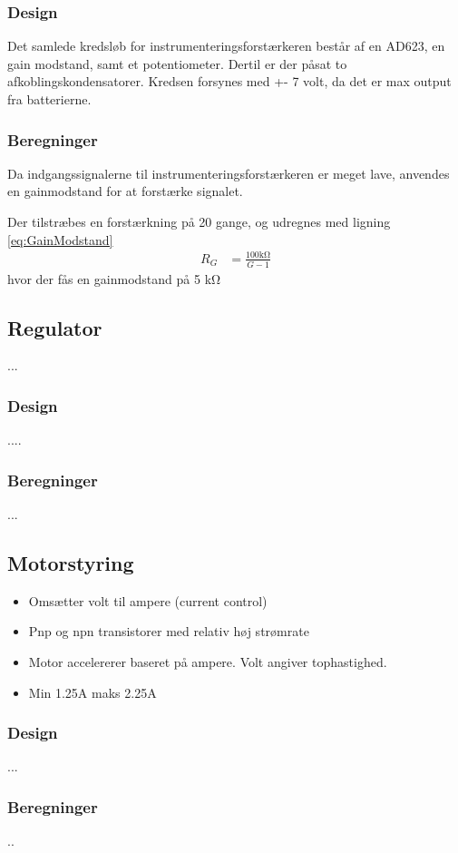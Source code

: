 \subsubsection{Design}
Det samlede kredsløb for instrumenteringsforstærkeren består af en AD623, en gain modstand, samt et potentiometer. Dertil er der påsat to afkoblingskondensatorer. Kredsen forsynes med +- 7 volt, da det er max output fra batterierne. 


\subsubsection{Beregninger}
Da indgangssignalerne til instrumenteringsforstærkeren er meget lave, anvendes en gainmodstand for at forstærke signalet.

Der tilstræbes en forstærkning på 20 gange, og udregnes med ligning \ref{eq:GainModstand}
\begin{align}
	R_G & = \frac{100 \si{\kilo\ohm}}{G-1} \label{eq:GainModstand}
\end{align}
hvor der fås en gainmodstand på 5 \si{\kilo\ohm}

\subsection{Regulator}
...

\subsubsection{Design}
....
\subsubsection{Beregninger}
...

\subsection{Motorstyring}\label{sec:sec_motorstyring}

\begin{itemize}
	\item Omsætter volt til ampere (current control)
	\item Pnp og npn transistorer med relativ høj strømrate
	\item Motor accelererer baseret på ampere. Volt angiver tophastighed.
	\item Min 1.25A maks 2.25A
\end{itemize}

\subsubsection{Design}
...

\subsubsection{Beregninger}
..
